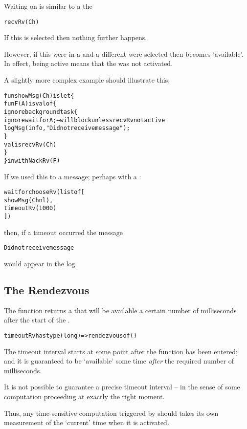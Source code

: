 Waiting on  is similar to a  the 
\begin{alltt}
recvRv(Ch)
\end{alltt}

If this  is selected then nothing further happens.

However, if this  were in a  and a different  were selected then  becomes 'available'. In effect,  being active means that the  was not activated.

A slightly more complex example should illustrate this:
\begin{alltt}
fun showMsg(Ch) is let\{
  fun F(A) is valof\{
    ignore background task \{
      ignore wait for A; -- will block unless recvRv not active
      logMsg(info,"Did not receive message");
    \}
    valis recvRv(Ch)
  \}
\} in withNackRv(F)
\end{alltt}
If we used this to  a message; perhaps with a :
\begin{alltt}
wait for chooseRv(list of [
  showMsg(Chnl),
  timeoutRv(1000)
])
\end{alltt}
then, if a timeout occurred the message
\begin{alltt}
Did not receive message
\end{alltt}
would appear in the log.

\subsection{The  Rendezvous}
\label{timeoutRvFun}

The  function returns a  that will be available a certain number of milliseconds after the start of the .
\begin{alltt}
timeoutRv has type (long)=>rendezvous of ()
\end{alltt}
The timeout interval starts at some point after the  function has been entered; and it is guaranteed to be `available' some time \emph{after} the required number of milliseconds.
\begin{aside}
It is not possible to guarantee a precise timeout interval -- in the sense of some computation proceeding at exactly the right moment.

Thus, any time-sensitive computation triggered by  should takes its own measurement of the `current' time when it is activated.
\end{aside}

